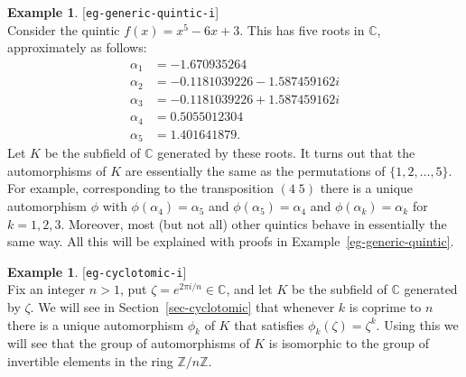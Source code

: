 \documentclass{amsart}
\newcommand{\lbl}[1]{\label{#1}\textup{[\texttt{#1}]}\ \\}
\newcommand{\lbl}{\label}
\newcommand{\Z}         {{\mathbb{Z}}}
\newcommand{\C}         {{\mathbb{C}}}
\newcommand{\al}        {\alpha}
\newcommand{\zt}        {\zeta}
\renewcommand{\:}{\colon}
\theoremstyle{definition}
\newtheorem{example}[theorem]{Example}
\begin{document}
\begin{example}\lbl{eg-generic-quintic-i}
 Consider the quintic $f(x)=x^5-6x+3$.  This has five roots in $\C$,
 approximately as follows:
 \begin{align*}
  \al_1 &= -1.670935264 \\
  \al_2 &= -0.1181039226 - 1.587459162 i \\
  \al_3 &= -0.1181039226 + 1.587459162 i \\
  \al_4 &= 0.5055012304 \\
  \al_5 &= 1.401641879.
 \end{align*}
 Let $K$ be the subfield of $\C$ generated by these roots.  It turns
 out that the automorphisms of $K$ are essentially the same as the
 permutations of $\{1,2,\dotsc,5\}$.  For example, corresponding to
 the transposition $(4\; 5)$ there is a unique automorphism $\phi$
 with $\phi(\al_4)=\al_5$ and $\phi(\al_5)=\al_4$ and
 $\phi(\al_k)=\al_k$ for $k=1,2,3$.  Moreover, most (but not all)
 other quintics behave in essentially the same way.  All this will be
 explained with proofs in Example~\ref{eg-generic-quintic}.
\end{example}


\begin{example}\lbl{eg-cyclotomic-i}
 Fix an integer $n>1$, put $\zt=e^{2\pi i/n}\in\C$, and let $K$ be the
 subfield of $\C$ generated by $\zt$.  We will see in
 Section~\ref{sec-cyclotomic} that whenever $k$ is coprime to $n$
 there is a unique automorphism $\phi_k$ of $K$ that satisfies
 $\phi_k(\zt)=\zt^k$.  Using this we will see that the group of
 automorphisms of $K$ is isomorphic to the group of invertible
 elements in the ring $\Z/n\Z$.
\end{example}
\end{document}
